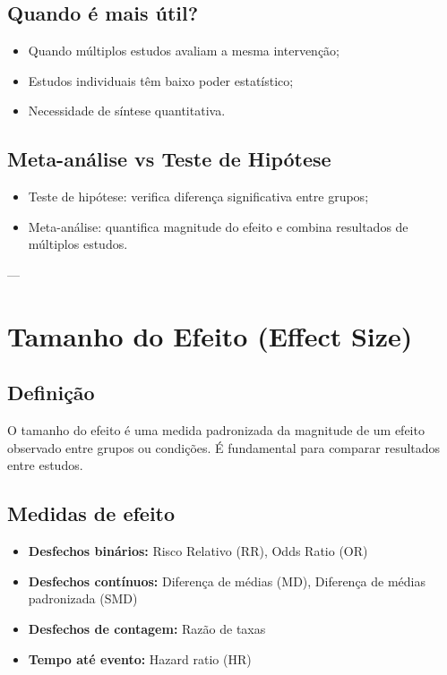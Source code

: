 \documentclass[12pt,a4paper]{article}
\begin{document}
\subsection{Quando é mais útil?}
\begin{itemize}
    \item Quando múltiplos estudos avaliam a mesma intervenção;
    \item Estudos individuais têm baixo poder estatístico;
    \item Necessidade de síntese quantitativa.
\end{itemize}

\subsection{Meta-análise vs Teste de Hipótese}
\begin{itemize}
    \item Teste de hipótese: verifica diferença significativa entre grupos;
    \item Meta-análise: quantifica magnitude do efeito e combina resultados de múltiplos estudos.
\end{itemize}

---

\section{Tamanho do Efeito (Effect Size)}
\subsection{Definição}
O tamanho do efeito é uma medida padronizada da magnitude de um efeito observado entre grupos ou condições. É fundamental para comparar resultados entre estudos.

\subsection{Medidas de efeito}
\begin{itemize}
    \item \textbf{Desfechos binários:} Risco Relativo (RR), Odds Ratio (OR)
    \item \textbf{Desfechos contínuos:} Diferença de médias (MD), Diferença de médias padronizada (SMD)
    \item \textbf{Desfechos de contagem:} Razão de taxas
    \item \textbf{Tempo até evento:} Hazard ratio (HR)
\end{itemize}
\end{document}
